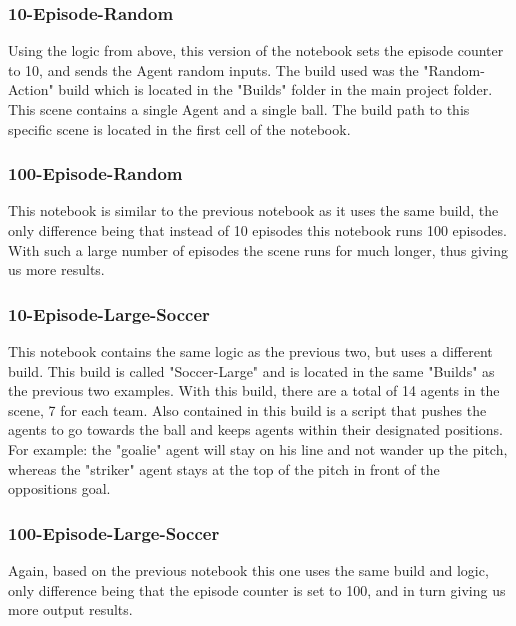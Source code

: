 \subsubsection{10-Episode-Random}
Using the logic from above, this version of the notebook sets the episode counter to 10, and sends the Agent random inputs. The build used was the "Random-Action" build which is located in the "Builds" folder in the main project folder. This scene contains a single Agent and a single ball. The build path to this specific scene is located in the first cell of the notebook. 

\subsubsection{100-Episode-Random}
This notebook is similar to the previous notebook as it uses the same build, the only difference being that instead of 10 episodes this notebook runs 100 episodes. With such a large number of episodes the scene runs for much longer, thus giving us more results.

\subsubsection{10-Episode-Large-Soccer}
This notebook contains the same logic as the previous two, but uses a different build. This build is called "Soccer-Large" and is located in the same "Builds" as the previous two examples. With this build, there are a total of 14 agents in the scene, 7 for each team. Also contained in this build is a script that pushes the agents to go towards the ball and keeps agents within their designated positions. For example: the "goalie" agent will stay on his line and not wander up the pitch, whereas the "striker" agent stays at the top of the pitch in front of the oppositions goal.

\subsubsection{100-Episode-Large-Soccer}
Again, based on the previous notebook this one uses the same build and logic, only difference being that the episode counter is set to 100, and in turn giving us more output results.

